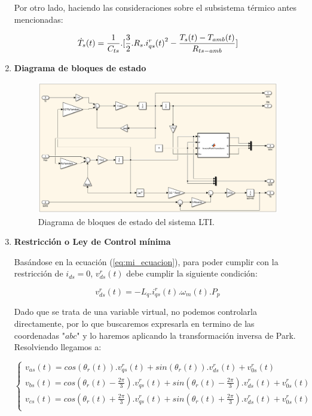 \documentclass{article}
\begin{document}
\begin{enumerate}[label=\roman*.]
    Por otro lado, haciendo las consideraciones sobre el subsistema térmico antes mencionadas:

    \begin{equation}
        \dot{T}_{s}(t) = \frac{1}{C_{ts}}.[\frac{3}{2}.R_{s}.{i_{qs}^r(t)}^2 - \frac{T_{s}(t)-T_{amb}(t)}{R_{ts-amb}}]\\
    \end{equation}
        
    \item \textbf{Diagrama de bloques de estado}
    
    \begin{figure}[H]
        \centering
        \includegraphics[width=1\textwidth]{LTI.png}
        \caption{Diagrama de bloques de estado del sistema LTI.}
    \end{figure}
    
    \item \textbf{Restricción o Ley de Control mínima}

    Basándose en la ecuación (\ref{eq:mi_ecuacion}), para poder cumplir con la restricción de $i_{ds} = 0$, $v_{ds}^r(t)$ debe cumplir la siguiente condición:

    \begin{equation}
        v_{ds}^r(t) = -L_{q}.i_{qs}^r(t).\omega_{m}(t).P_{p}
    \end{equation}

    Dado que se trata de una variable virtual, no podemos controlarla directamente, por lo que buscaremos
    expresarla en termino de las coordenadas "$abc$" y lo haremos aplicando la transformación inversa de Park.
    Resolviendo llegamos a:

    \begin{equation}
        \begin{cases}
            v_{as}(t) = cos(\theta_{r}(t)).v_{qs}^r(t) + sin(\theta_{r}(t)).v_{ds}^r(t) + v_{0s}^r(t)\\
            v_{bs}(t) = cos(\theta_{r}(t) - \frac{2\pi}{3}).v_{qs}^r(t) + sin(\theta_{r}(t) - \frac{2\pi}{3}).v_{ds}^r(t) + v_{0s}^r(t)\\
            v_{cs}(t) = cos(\theta_{r}(t) + \frac{2\pi}{3}).v_{qs}^r(t) + sin(\theta_{r}(t) + \frac{2\pi}{3}).v_{ds}^r(t) + v_{0s}^r(t)\\
        \end{cases}
    \end{equation}


\end{enumerate}
\end{document}
